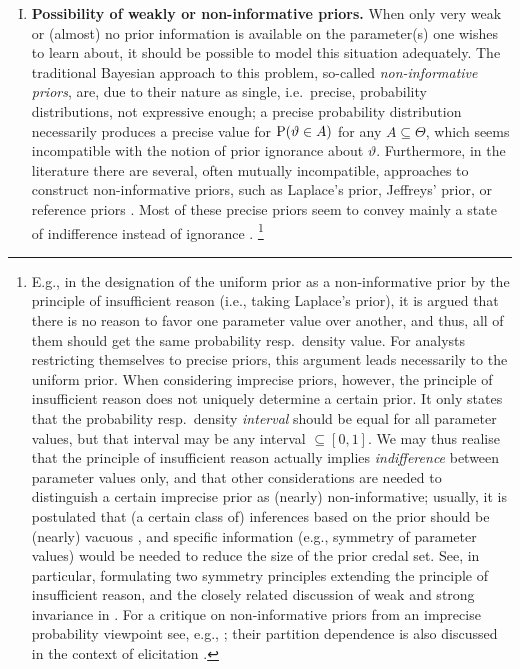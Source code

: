 \begin{enumerate}[I.]
\item \textbf{Possibility of weakly or non-informative priors.}\label{enum:noninformative}
When only very weak or (almost) no prior information is available on the parameter(s) one wishes to learn about,
it should be possible to model this situation adequately.
The traditional Bayesian approach to this problem, so-called \emph{non-informative priors},
are, due to their nature as single, i.e.\ precise, probability distributions, not expressive enough;
a precise probability distribution necessarily produces a precise value for $\operatorname{P}(\vartheta \in A)$ for any $A \subseteq \Theta$,
which seems incompatible with the notion of prior ignorance about $\vartheta$.
Furthermore, in the literature there are several, often mutually incompatible, approaches to construct non-informative priors,
such as Laplace's prior, Jeffreys' prior, or reference priors \parencite[see, e.g.,][\S 5.6.2]{2000:bernardosmith}.
Most of these precise priors seem to convey mainly a state of indifference instead of ignorance \parencite[p.~271]{1999:rueger}.%
\footnote{\label{footnote:symm}E.g., in the designation of the uniform prior
as a non-informative prior by the principle of insufficient reason (i.e., taking Laplace's prior),
it is argued that there is no reason to favor one parameter value over another,
and thus, all of them should get the same probability resp.\ density value.
For analysts restricting themselves to precise priors, this argument leads necessarily to the uniform prior.
When considering imprecise priors, however, the principle of insufficient reason does not uniquely determine a certain prior.
It only states that the probability resp.\ density \emph{interval} should be equal for all parameter values,
but that interval may be any interval $\subseteq [0,1]$.
We may thus realise that the principle of insufficient reason actually implies \emph{indifference} between parameter values only,
and that other considerations are needed to distinguish a certain imprecise prior as (nearly) non-informative;
usually, it is postulated that (a certain class of) inferences based on the prior should be (nearly) vacuous
\parencite[see, e.g.,][]{2012:benavolizaffalon},
and specific information (e.g., symmetry of parameter values) would be needed to reduce the size of the prior credal set.
See, in particular, \textcite[\S 4.3]{2001:weichselberger} formulating two symmetry principles
extending the principle of insufficient reason,
and the closely related discussion of weak and strong invariance in \textcite[\S 3]{itip-structural}.
For a critique on non-informative priors from an imprecise probability viewpoint see, e.g., \textcite[\S 5.5]{1991:walley};
their partition dependence is also discussed in the context of elicitation \parencite[see][\S 3]{itip-elicitation}.}
\end{enumerate}

